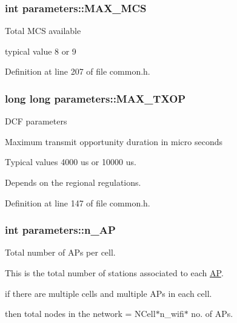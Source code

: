 \hypertarget{structparameters_ab2821a9be5274d77b2f4f76ff06b2e65}{
\subsubsection[{M\-A\-X\-\_\-\-M\-C\-S}]{\setlength{\rightskip}{0pt plus 5cm}int parameters\-::\-M\-A\-X\-\_\-\-M\-C\-S}}\label{structparameters_ab2821a9be5274d77b2f4f76ff06b2e65}
Total M\-C\-S available \par
typical value 8 or 9 \par


Definition at line 207 of file common.\-h.

\hypertarget{structparameters_ae7178f23f8bef3a2a715f63bfe0dd485}{
\subsubsection[{M\-A\-X\-\_\-\-T\-X\-O\-P}]{\setlength{\rightskip}{0pt plus 5cm}long long parameters\-::\-M\-A\-X\-\_\-\-T\-X\-O\-P}}\label{structparameters_ae7178f23f8bef3a2a715f63bfe0dd485}
D\-C\-F parameters \par
Maximum transmit opportunity duration in micro seconds \par
Typical values 4000 us or 10000 us. \par
Depends on the regional regulations. \par


Definition at line 147 of file common.\-h.

\hypertarget{structparameters_aa2b1067022fb06903d7529ea0af5d45f}{
\subsubsection[{n\-\_\-\-A\-P}]{\setlength{\rightskip}{0pt plus 5cm}int parameters\-::n\-\_\-\-A\-P}}\label{structparameters_aa2b1067022fb06903d7529ea0af5d45f}
Total number of A\-Ps per cell. \par
This is the total number of stations associated to each \hyperlink{classAP}{A\-P}. \par
if there are multiple cells and multiple A\-Ps in each cell. \par
then total nodes in the network = N\-Cell$\ast$n\-\_\-wifi$\ast$ no. of A\-Ps. \par


